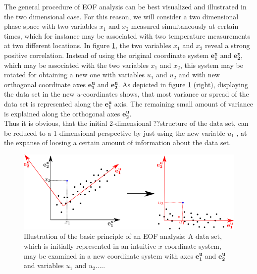  The general procedure of EOF analysis can be best visualized and illustrated in the two dimensional case. For this reason, we will consider a two dimensional phase space with two variables $x_1$ and $x_2$ measured simultaneously at certain times, which for instance may be associated with two temperature measurements at two different locations. %
In figure \ref{fig:EOF_2d}, the two variables $x_1$ and $x_2$ reveal a strong positive correlation. Instead of using the original coordinate system $\bm{e_{1}^x}$ and $\bm{e_{2}^x}$, which may be associated with the two variables $x_1$ and $x_2$, this system may be rotated for obtaining a new one with variables $u_1$ and $u_2$ and with new orthogonal coordinate axes $\bm{e_{1}^u}$ and $\bm{e_{2}^u}$. As depicted in figure \ref{fig:EOF_2d} (right), displaying the data set in the new $u$-coordinates shows, that most variance or spread of the data set is represented along the $\bm{e_{1}^u}$ axis. The remaining small amount of variance is explained along the orthogonal axes $\bm{e_{2}^u}$.\\
Thus it is obvious, that the initial 2-dimensional ??structure of the data set, can be reduced to a 1-dimensional perspective by just using the new variable $u_1$ , at the expanse of loosing a certain amount of information about the data set.

\begin{figure}
	\centering
		\includegraphics[scale=0.7]{pictures/EOF_2d}
		\caption{Illustration of the basic principle of an EOF analysis: A data set, which is initially represented in an intuitive $x$-coordinate system, may be examined in a new coordinate system with axes $\bm{e_{1}^u}$ and $\bm{e_{2}^u}$ and variables $u_1$ and $u_2$.....  } \label{fig:EOF_2d}
\end{figure}

